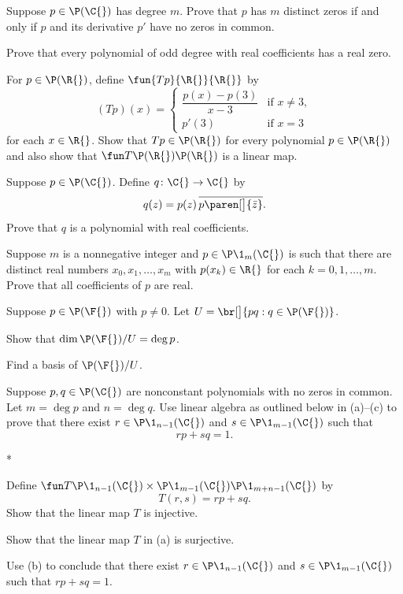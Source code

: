 \exercise
Suppose $p \in \P(\C{})$ has degree $m$.  Prove that $p$ has $m$ distinct zeros if
and only if $p$ and its derivative $p'$ have no zeros in common.


\exercise
Prove that every polynomial of odd degree with real coefficients has a real zero.\label{4oddzero}


\exercise
For $p \in \P(\R{})$, define $\fun {Tp} {\R{}} {\R{}}$ by
\[
(Tp)(x) =
\begin{cases}
\dfrac{p(x) - p(3)}{x-3} & \text{if } x \ne 3,\\[9bp]
p' \! (3) & \text{if } x = 3
\end{cases}
\]
for each $x \in \R{}$. Show that $Tp \in \P(\R{})$ for every polynomial $p \in \P(\R{})$ and also show that $\fun T {\P(\R{})} {\P(\R{})}$ is a linear map.


\exercise
Suppose $p \in \P(\C{})$. Define $q \colon \C{} \to \C{}$ by
\[
q(z) = p(z) \, \overline{ p\paren[\big]{\bar{z}} }.
\]
Prove that $q$ is a polynomial with real coefficients.


\exercise
Suppose $m$ is a nonnegative integer and $p \in \P\1_m(\C{})$ is such that there are distinct real numbers $x_0, x_1, \dots, x_m$ with $p(x_k) \in \R{}$ for each $k = 0, 1, \dots, m$. Prove that all coefficients of $p$ are real.


\pagebreak[2]

\exercise
Suppose $p \in \P(\F{})$ with $p \ne 0$. Let $U = \br[\big]{p q : q \in \P(\F{})}$.
\begin{subtheorem}
\item
Show that $\dim \P(\F{})/U = \deg p$.
\item
Find a basis of $\P(\F{})/U$.
\end{subtheorem}
\exercisesubtheoremend


\exercise
Suppose $p, q \in \P(\C{})$ are nonconstant polynomials with no zeros in common. Let $m = \deg p$ and $n = \deg q$. Use linear algebra as outlined below in (a)--(c) to prove that there exist
$r \in \P\1_{n-1}(\C{})$ and $s \in \P\1_{m-1}(\C{})$ such that
\[
rp + sq = 1.
\]
\begin{subtheorem}*
\item
Define $\fun T { \P\1_{n-1}(\C{}) \times \P\1_{m-1}(\C{}) } {\P\1_{m+n-1}(\C{})}$ by
\[
T(r, s) = rp + sq.
\]
Show that the linear map $T$ is injective.
\item
Show that the linear map $T$ in (a) is surjective.
\item
Use (b) to conclude that there exist $r \in \P\1_{n-1}(\C{})$ and $s \in \P\1_{m-1}(\C{})$ such that $rp + sq = 1$.
\end{subtheorem}
\exercisesubtheoremend


